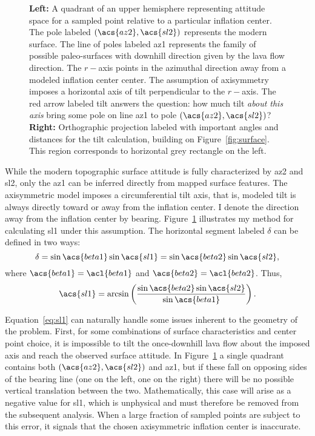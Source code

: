 \begin{figure}
\begin{center}
    \caption[\Acl{tilt} from mapping]{\textbf{Left:} A quadrant of an upper hemisphere representing attitude space for a sampled point relative to a particular inflation center. The pole labeled $\left(\acs{az2},\acs{sl2}\right)$ represents the modern surface. The line of poles labeled \acs{az1} represents the family of possible paleo-surfaces with downhill direction given by the lava flow direction. The $r-$axis points in the azimuthal direction away from a modeled inflation center \acs{center}. The assumption of axisymmetry imposes a horizontal axis of tilt perpendicular to the $r-$axis. The red arrow labeled \acs{tilt} answers the question: how much tilt \emph{about this axis} bring some pole on line \acs{az1} to pole $\left(\acs{az2},\acs{sl2}\right)$? \textbf{Right:} Orthographic projection labeled with important angles and distances for the tilt calculation, building on Figure~\ref{fig:surface}. This region corresponds to horizontal grey rectangle on the left.}%
    \label{fig:tilt-from-map}%
\end{center}
\end{figure}
While the modern topographic surface attitude is fully characterized by \acs{az2} and \acs{sl2}, only the \acf{az1} can be inferred directly from mapped surface features. The axisymmetric model imposes a circumferential tilt axis, that is, modeled tilt is always directly toward or away from the inflation center. I denote the direction away from the inflation center by \acs{bearing}. Figure~\ref{fig:tilt-from-map} illustrates my method for calculating \acf{sl1} under this assumption. The horizontal segment labeled $\delta$ can be defined in two ways:
\begin{equation*}
    \delta = \sin\acs{beta1}\sin\acs{sl1} = \sin\acs{beta2}\sin\acs{sl2},
\end{equation*}
where $\acs{beta1} = \acl{beta1}$ and $\acs{beta2} = \acl{beta2}$. Thus,
\begin{equation}
    \acs{sl1} = \arcsin\left(\frac{\sin\acs{beta2}\sin\acs{sl2}}{\sin\acs{beta1}}\right).\label{eq:sl1}
\end{equation}

Equation~\eqref{eq:sl1} can naturally handle some issues inherent to the geometry of the problem. First, for some combinations of surface characteristics and center point choice, it is impossible to tilt the once-downhill lava flow about the imposed axis and reach the observed surface attitude. In Figure~\ref{fig:tilt-from-map} a single quadrant contains both $\left(\acs{az2},\acs{sl2}\right)$ and \acs{az1}, but if these fall on opposing sides of the \acs{bearing} line (one on the left, one on the right) there will be no possible vertical translation between the two. Mathematically, this case will arise as a negative value for \acs{sl1}, which is unphysical and must therefore be removed from the subsequent analysis. When a large fraction of sampled points are subject to this error, it signals that the chosen axisymmetric inflation center is inaccurate.

